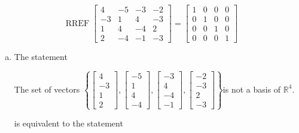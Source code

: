 \begin{exerciseAnswer} 


\[\operatorname{RREF} \left[\begin{array}{cccc}
4 & -5 & -3 & -2 \\
-3 & 1 & 4 & -3 \\
1 & 4 & -4 & 2 \\
2 & -4 & -1 & -3
\end{array}\right] = \left[\begin{array}{cccc}
1 & 0 & 0 & 0 \\
0 & 1 & 0 & 0 \\
0 & 0 & 1 & 0 \\
0 & 0 & 0 & 1
\end{array}\right] \]


\begin{enumerate}[(a)]
\item The statement 
\begin{center}\begin{minipage}{0.8\textwidth}
 The set of vectors \( \left\{ \left[\begin{array}{c}
4 \\
-3 \\
1 \\
2
\end{array}\right] , \left[\begin{array}{c}
-5 \\
1 \\
4 \\
-4
\end{array}\right] , \left[\begin{array}{c}
-3 \\
4 \\
-4 \\
-1
\end{array}\right] , \left[\begin{array}{c}
-2 \\
-3 \\
2 \\
-3
\end{array}\right] \right\} \)is not a basis of \(\mathbb{R}^4\). 
\end{minipage}\end{center}
     is equivalent to the statement 
\begin{center}\begin{minipage}{0.8\textwidth}
 The set of vectors \( \left\{ \left[\begin{array}{c}
4 \\
-3 \\

\end{array}
\end{minipage}
\end{center}
\end{enumerate}
\end{exerciseAnswer}
